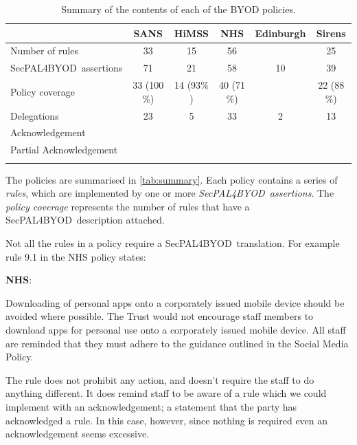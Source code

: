 \documentclass{llncs}
\newcommand{\AppPAL}[0]{SecPAL4BYOD}
\newenvironment{policyrule}[1]{%
  \begin{mdframed}\footnotesize
      \noindent\textbf{\sffamily #1}:~\itshape%
}{%
  \end{mdframed}
}
\begin{document}
\begin{table}\centering\footnotesize\sffamily
  \begin{tabular}{l c c c c c}
    \toprule
                             & {SANS}       & {HiMSS}     & {NHS}       & {Edinburgh} & {Sirens}    \\
    \midrule
    Number of rules          & 33           & 15          & 56          &             & 25          \\
    \AppPAL~assertions       & 71           & 21          & 58          & 10          & 39          \\
    Policy coverage          & 33 (100$\%$) & 14 (93$\%$) & 40 (71$\%$) &             & 22 (88$\%$) \\
    \midrule
    Delegations              & 23           & 5           & 33          & 2           & 13          \\
    Acknowledgement          &              &             &             &             &             \\
    Partial Acknowledgement  &              &             &             &             &             \\
    \bottomrule             \\
  \end{tabular}
  \label{tab:summary}
  \caption{Summary of the contents of each of the BYOD policies.}
\end{table}

The policies are summarised in \autoref{tab:summary}.
Each policy contains a series of \emph{rules}, which are implemented by one or more \emph{\AppPAL~assertions}.
The \emph{policy coverage} represents the number of rules that have a \AppPAL~description attached.

Not all the rules in a policy require a \AppPAL~translation.
For example rule 9.1 in the NHS policy states:
\begin{policyrule}{NHS}
  Downloading of personal apps onto a corporately issued mobile device should be avoided where possible.
  The Trust would not encourage staff members to download apps for personal use onto a corporately issued mobile device.
  All staff are reminded that they must adhere to the guidance outlined in the Social Media Policy.
\end{policyrule}
The rule does not prohibit any action, and doesn't require the staff to do anything different.
It does remind staff to be aware of a rule which we could implement with an acknowledgement; a statement that the party has acknowledged a rule.
In this case, however, since nothing is required even an acknowledgement seems excessive.
\end{document}
